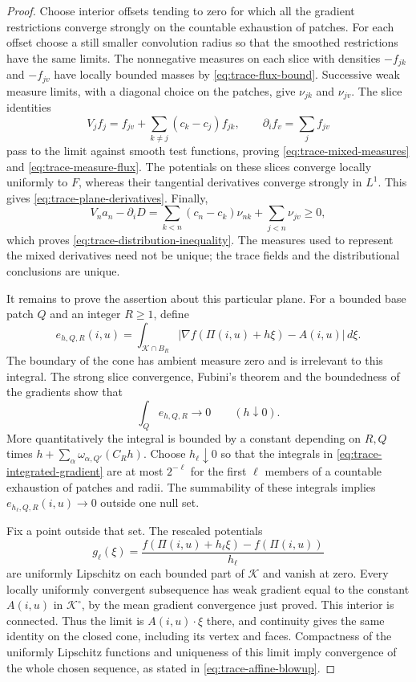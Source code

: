 \begin{proof}
Choose interior offsets tending to zero for which all the gradient
restrictions converge strongly on the countable exhaustion of patches.
For each offset choose a still smaller convolution radius so that the
smoothed restrictions have the same limits.  The nonnegative measures
on each slice with densities $-f_{jk}$ and $-f_{jv}$ have locally bounded
masses by \eqref{eq:trace-flux-bound}.  Successive weak measure limits,
with a diagonal choice on the patches, give $\nu_{jk}$ and $\nu_{jv}$.
The slice identities
\[
 V_jf_j=f_{jv}+\sum_{k\ne j}(c_k-c_j)f_{jk},
 \qquad \partial_if_v=\sum_jf_{jv}
\]
pass to the limit against smooth test functions, proving
\eqref{eq:trace-mixed-measures} and \eqref{eq:trace-measure-flux}.
The potentials on these slices converge locally uniformly to $F$,
whereas their tangential derivatives converge strongly in $L^1$.
This gives \eqref{eq:trace-plane-derivatives}.  Finally,
\[
 V_na_n-\partial_iD
 =\sum_{k<n}(c_n-c_k)\nu_{nk}+\sum_{j<n}\nu_{jv}\ge0,
\]
which proves \eqref{eq:trace-distribution-inequality}.
The measures used to represent the mixed derivatives need not be
unique; the trace fields and the distributional conclusions are unique.

It remains to prove the assertion about this particular plane.
For a bounded base patch $Q$ and an integer $R\ge1$, define
\[
 e_{h,Q,R}(i,u)=\int_{\mathcal K\cap B_R}
       |\nabla f(\Pi(i,u)+h\xi)-A(i,u)|\,d\xi.
\]
The boundary of the cone has ambient measure zero and is irrelevant to
this integral.  The strong slice convergence, Fubini's theorem and the
boundedness of the gradients show that
\begin{equation}\label{eq:trace-integrated-gradient}
 \int_Qe_{h,Q,R}\longrightarrow0\qquad(h\downarrow0).
\end{equation}
More quantitatively the integral is bounded by a constant depending on
$R,Q$ times $h+\sum_\alpha\omega_{\alpha,Q'}(C_Rh)$.
Choose $h_\ell\downarrow0$ so that the integrals in
\eqref{eq:trace-integrated-gradient} are at most $2^{-\ell}$ for the
first $\ell$ members of a countable exhaustion of patches and radii.
The summability of these integrals implies
$e_{h_\ell,Q,R}(i,u)\to0$ outside one null set.

Fix a point outside that set.  The rescaled potentials
\[
 g_\ell(\xi)=
 \frac{f(\Pi(i,u)+h_\ell\xi)-f(\Pi(i,u))}{h_\ell}
\]
are uniformly Lipschitz on each bounded part of $\mathcal K$ and vanish
at zero.  Every locally uniformly convergent subsequence has weak
gradient equal to the constant $A(i,u)$ in $\mathcal K^\circ$, by the
mean gradient convergence just proved.  This interior is connected.
Thus the limit is $A(i,u)\cdot\xi$ there, and continuity gives the same
identity on the closed cone, including its vertex and faces.
Compactness of the uniformly Lipschitz functions and uniqueness of
this limit imply convergence of the whole chosen sequence, as stated
in \eqref{eq:trace-affine-blowup}.
\end{proof}

